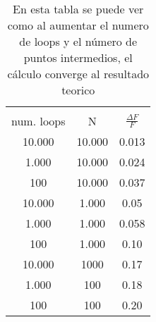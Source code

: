 \begin{table}
\begin{center}
 \begin{tabular}{|| c c c||} 
 \hline \\ 
 num. loops & N & $\frac{ \Delta F}{F}$ \\ [0.5ex] 
 \hline\hline
  10.000 & 10.000& 0.013 \\ 
 \hline
  1.000 & 10.000 & 0.024 \\
 \hline
  100 & 10.000 & 0.037\\
 \hline
  10.000 & 1.000 & 0.05 \\
 \hline
  1.000 & 1.000 & 0.058 \\ 
 \hline
   100 & 1.000 & 0.10 \\
 \hline
  10.000 & 1000 & 0.17\\
 \hline
  1.000 & 100 & 0.18 \\
 \hline
   100 & 100 & 0.20 \\ [1ex] 
 \hline
\end{tabular}
\end{center}
\caption{En esta tabla se puede ver como al aumentar el numero de loops y el número de puntos intermedios, el cálculo converge al resultado teorico}
\label{table:1}
\end{table}

